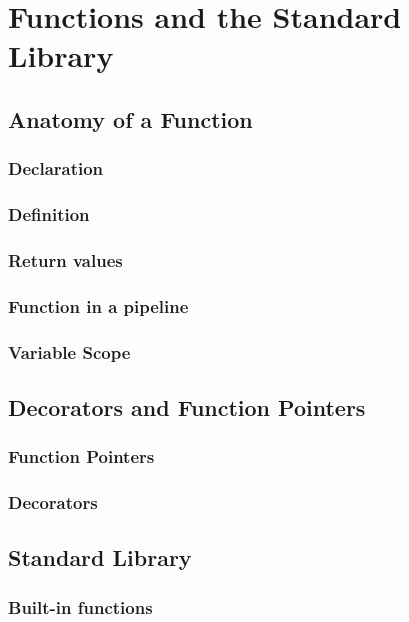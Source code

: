 \documentclass[./LRM_main.tex]{subfiles}
\begin{document}


\chapter{Functions and the Standard Library}
\section{Anatomy of a Function}
\subsection{Declaration}
\subsection{Definition}
\subsection{Return values}
\subsection{Function in a pipeline}
\subsection{Variable Scope}
\section{Decorators and Function Pointers}
\subsection{Function Pointers}
\subsection{Decorators}
\section{Standard Library}
\subsection{Built-in functions}
\begin{comment}
sizeof
sprintf
strlen
strcompare
substring
strlen
sprintf
\end{comment}
\end{document}

